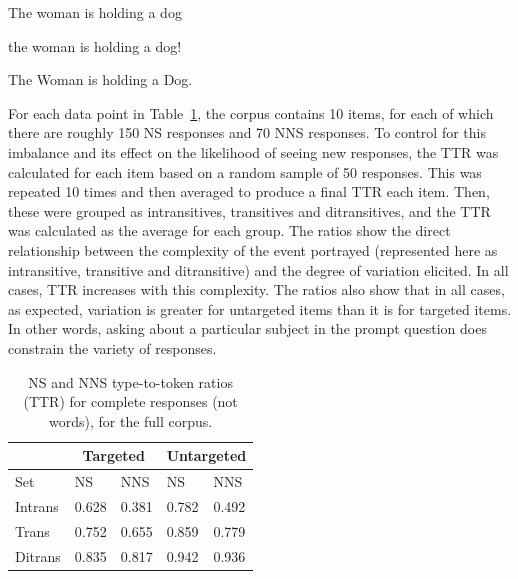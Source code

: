 \begin{exe}[h!]
  \ex\label{exe:ttr-1}The woman is holding a dog
\end{exe}
\begin{exe}[h!]
  \ex\label{exe:ttr-2}the woman is holding a dog!
\end{exe}
\begin{exe}[h!]
  \ex\label{exe:ttr-3}The Woman is holding a Dog.
\end{exe}

For each data point in Table~\ref{tab:ttr}, the corpus contains 10 items, for each of which there are roughly 150 NS responses and 70 NNS responses. To control for this imbalance and its effect on the likelihood of seeing new responses, the TTR was calculated for each item based on a random sample of 50 responses.  This was repeated 10 times and then averaged to produce a final TTR each item. Then, these were grouped as intransitives, transitives and ditransitives, and the TTR was calculated as the average for each group. The ratios show the direct relationship between the complexity of the event portrayed (represented here as intransitive, transitive and ditransitive) and the degree of variation elicited. In all cases, TTR increases with this complexity.
The ratios also show that in all cases, as expected, variation is greater for untargeted items than it is for targeted items. In other words, asking about a particular subject in the prompt question does constrain the variety of responses.

\begin{table}[h!]
\begin{center}
\begin{tabular}{|l||l|l||l|l|}
\hline
 & \multicolumn{2}{|c||}{Targeted} & \multicolumn{2}{|c|}{Untargeted} \\
\hline
 Set & NS & NNS & NS & NNS \\
\hline
\hline
Intrans & 0.628 & 0.381 & 0.782 & 0.492 \\
\hline
Trans & 0.752 & 0.655 & 0.859 & 0.779 \\ %
\hline
Ditrans & 0.835 & 0.817 & 0.942 & 0.936 \\ 
\hline
\end{tabular}
\caption{\label{tab:ttr} NS and NNS type-to-token ratios (TTR) for complete responses (not words), for the full corpus.}
\end{center}
\end{table}

